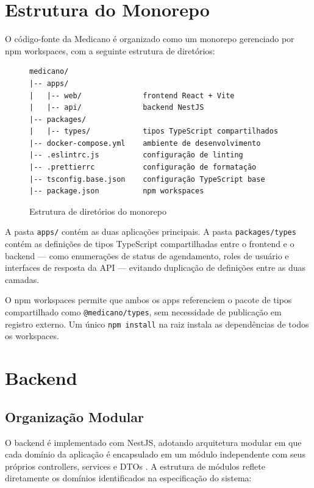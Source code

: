 \section{Estrutura do Monorepo}
\label{sec:monorepo}

O código-fonte da Medicano é organizado como um
monorepo gerenciado por npm workspaces, com a
seguinte estrutura de diretórios:

\begin{figure}[H]
  \centering
  \caption{Estrutura de diretórios do monorepo}
  \label{fig:monorepo-structure}
\begin{verbatim}
medicano/
|-- apps/
|   |-- web/              frontend React + Vite
|   |-- api/              backend NestJS
|-- packages/
|   |-- types/            tipos TypeScript compartilhados
|-- docker-compose.yml    ambiente de desenvolvimento
|-- .eslintrc.js          configuração de linting
|-- .prettierrc           configuração de formatação
|-- tsconfig.base.json    configuração TypeScript base
|-- package.json          npm workspaces
\end{verbatim}
\end{figure}

A pasta \texttt{apps/} contém as duas aplicações
principais. A pasta \texttt{packages/types} contém
as definições de tipos TypeScript compartilhadas
entre o frontend e o backend — como enumerações de
status de agendamento, roles de usuário e interfaces
de resposta da API — evitando duplicação de
definições entre as duas camadas.

O npm workspaces permite que ambos os apps
referenciem o pacote de tipos compartilhado como
\texttt{@medicano/types}, sem necessidade de
publicação em registro externo. Um único
\texttt{npm install} na raiz instala as dependências
de todos os workspaces.

\section{Backend}
\label{sec:backend}

\subsection{Organização Modular}
\label{subsec:backend-modules}

O backend é implementado com NestJS, adotando
arquitetura modular em que cada domínio da aplicação
é encapsulado em um módulo independente com seus
próprios controllers, services e DTOs
\cite{nestjs2024}. A estrutura de módulos reflete
diretamente os domínios identificados na
especificação do sistema:

